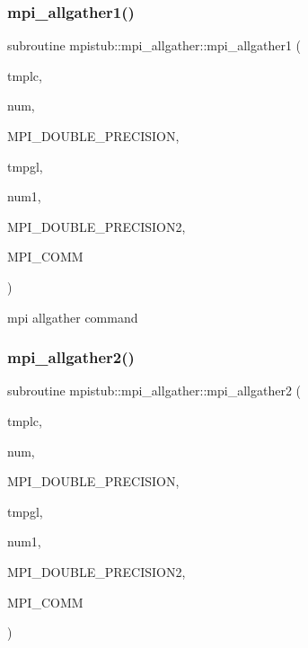 \subsubsection{\texorpdfstring{mpi\_allgather1()}{mpi\_allgather1()}}
{\footnotesize\ttfamily subroutine mpistub\+::mpi\+\_\+allgather\+::mpi\+\_\+allgather1 (\begin{DoxyParamCaption}\item[{double precision, dimension(\+:)}]{tmplc,  }\item[{}]{num,  }\item[{}]{M\+P\+I\+\_\+\+D\+O\+U\+B\+L\+E\+\_\+\+P\+R\+E\+C\+I\+S\+I\+ON,  }\item[{double precision, dimension(\+:)}]{tmpgl,  }\item[{}]{num1,  }\item[{}]{M\+P\+I\+\_\+\+D\+O\+U\+B\+L\+E\+\_\+\+P\+R\+E\+C\+I\+S\+I\+O\+N2,  }\item[{}]{M\+P\+I\+\_\+\+C\+O\+MM }\end{DoxyParamCaption})}



mpi allgather command 

\mbox{\label{interfacempistub_1_1mpi__allgather_ad38aaf8f5bb58287ef5c3c0327b9dcd0}} 
\subsubsection{\texorpdfstring{mpi\_allgather2()}{mpi\_allgather2()}}
{\footnotesize\ttfamily subroutine mpistub\+::mpi\+\_\+allgather\+::mpi\+\_\+allgather2 (\begin{DoxyParamCaption}\item[{double precision}]{tmplc,  }\item[{}]{num,  }\item[{}]{M\+P\+I\+\_\+\+D\+O\+U\+B\+L\+E\+\_\+\+P\+R\+E\+C\+I\+S\+I\+ON,  }\item[{double precision, dimension(\+:)}]{tmpgl,  }\item[{}]{num1,  }\item[{}]{M\+P\+I\+\_\+\+D\+O\+U\+B\+L\+E\+\_\+\+P\+R\+E\+C\+I\+S\+I\+O\+N2,  }\item[{}]{M\+P\+I\+\_\+\+C\+O\+MM }\end{DoxyParamCaption})}

